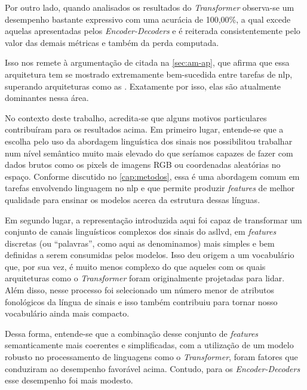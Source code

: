 Por outro lado, quando analisados os resultados do \textit{Transformer} observa-se um desempenho bastante expressivo com uma acurácia de 100,00\%, a qual excede aquelas apresentadas pelos \textit{Encoder-Decoders} e é reiterada consistentemente pelo valor das demais métricas e também da perda computada.

Isso nos remete à argumentação de  citada na \autoref{sec:am-ap}, que afirma que essa arquitetura tem se mostrado extremamente bem-sucedida entre tarefas de \acrfull{nlp}, superando arquiteturas como as . Exatamente por isso, elas são atualmente dominantes nessa área.

No contexto deste trabalho, acredita-se que alguns motivos particulares contribuíram para os resultados acima.
Em primeiro lugar, entende-se que a escolha pelo uso da abordagem linguística dos sinais nos possibilitou trabalhar num nível semântico muito mais elevado do que seríamos capazes de fazer com dados brutos como os pixels de imagens RGB ou coordenadas aleatórias no espaço. Conforme discutido no \autoref{cap:metodos}, essa é uma abordagem comum em tarefas envolvendo linguagem no \acrshort{nlp} e que permite produzir \textit{features} de melhor qualidade para ensinar os modelos acerca da estrutura dessas línguas.

Em segundo lugar, a representação introduzida aqui foi capaz de transformar um conjunto de canais linguísticos complexos dos sinais do \acrshort{asllvd}, em \textit{features} discretas (ou ``palavras'', como aqui as denominamos) mais simples e bem definidas a serem consumidas pelos modelos.
Isso deu origem a um vocabulário que, por sua vez, é muito menos complexo do que aqueles com os quais arquiteturas como o \textit{Transformer} foram originalmente projetadas para lidar. Além disso, nesse processo foi selecionado um número menor de atributos fonológicos da língua de sinais e isso também contribuiu para tornar nosso vocabulário ainda mais compacto.

Dessa forma, entende-se que a combinação desse conjunto de \textit{features} semanticamente mais coerentes e simplificadas, com a utilização de um modelo robusto no processamento de linguagens como o \textit{Transformer}, foram fatores que conduziram ao desempenho favorável acima.
Contudo, para os \textit{Encoder-Decoders} esse desempenho foi mais modesto.












